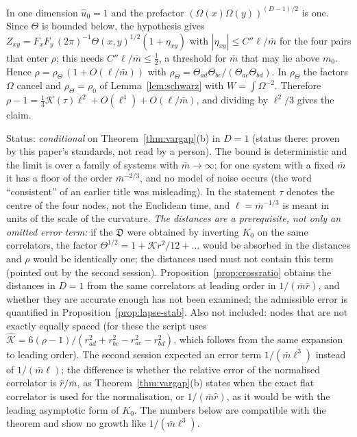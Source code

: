\documentclass[11pt,a4paper]{article}
\makeatletter
\theoremstyle{stmt}
\theoremstyle{defn}
\theoremstyle{rmk}
\renewenvironment{proof}[1][\proofname]{\par\pushQED{\qed}\normalfont\topsep6\p@\@plus6\p@\relax
  \trivlist\item[\hskip\labelsep{\sffamily\itshape\small #1.}]\ignorespaces}{\popQED\endtrivlist\@endpefalse}
\numberwithin{equation}{section}
\newcommand{\status}[1]{\par\noindent\textsf{\small Status: #1}\par}
\makeatother
\begin{document}
{\begin{proof}
In one dimension $\hat u_0=1$ and the prefactor $(\Omega(x)\Omega(y))^{(D-1)/2}$ is one. Since $\Theta$ is bounded below, the hypothesis gives $Z_{xy}=F_xF_y\,(2\pi)^{-1}\Theta(x,y)^{1/2}(1+\eta_{xy})$ with $|\eta_{xy}|\le C''\ell/\bar m$ for the four pairs that enter $\rho$; this needs $C''\ell/\bar m\le\frac12$, a threshold for $\bar m$ that may lie above $m_0$. Hence $\rho=\rho_\Theta\,(1+O(\ell/\bar m))$ with $\rho_\Theta=\Theta_{ad}\Theta_{bc}/(\Theta_{ac}\Theta_{bd})$. In $\rho_\Theta$ the factors $\Omega$ cancel and $\rho_\Theta=\rho_0$ of Lemma~\ref{lem:schwarz} with $W=\int\Omega^{-2}$. Therefore $\rho-1=\tfrac13\mathcal K(\tau)\ell^2+O(\ell^4)+O(\ell/\bar m)$, and dividing by $\ell^2/3$ gives the claim.
\end{proof}
\status{\emph{conditional} on Theorem~\ref{thm:vargap}(b) in $D=1$ (status there: proven by this paper's standards, not read by a person). The bound is deterministic and the limit is over a family of systems with $\bar m\to\infty$; for one system with a fixed $\bar m$ it has a floor of the order $\bar m^{-2/3}$, and no model of noise occurs (the word ``consistent'' of an earlier title was misleading). In the statement $\tau$ denotes the centre of the four nodes, not the Euclidean time, and $\ell=\bar m^{-1/3}$ is meant in units of the scale of the curvature. \emph{The distances are a prerequisite, not only an omitted error term:} if the $\mathfrak D$ were obtained by inverting $K_0$ on the same correlators, the factor $\Theta^{1/2}=1+\mathcal Kr^2/12+\dots$ would be absorbed in the distances and $\rho$ would be identically one; the distances used must not contain this term (pointed out by the second session). Proposition~\ref{prop:crossratio} obtains the distances in $D=1$ from the same correlators at leading order in $1/(\bar m\hat r)$, and whether they are accurate enough has not been examined; the admissible error is quantified in Proposition~\ref{prop:lapse-stab}. Also not included: nodes that are not exactly equally spaced (for these the script uses $\hat{\mathcal K}=6(\rho-1)/(r_{ad}^2+r_{bc}^2-r_{ac}^2-r_{bd}^2)$, which follows from the same expansion to leading order). The second session expected an error term $1/(\bar m\ell^3)$ instead of $1/(\bar m\ell)$; the difference is whether the relative error of the normalised correlator is $\hat r/\bar m$, as Theorem~\ref{thm:vargap}(b) states when the exact flat correlator is used for the normalisation, or $1/(\bar m\hat r)$, as it would be with the leading asymptotic form of $K_0$. The numbers below are compatible with the theorem and show no growth like $1/(\bar m\ell^3)$.}

}
\end{document}
